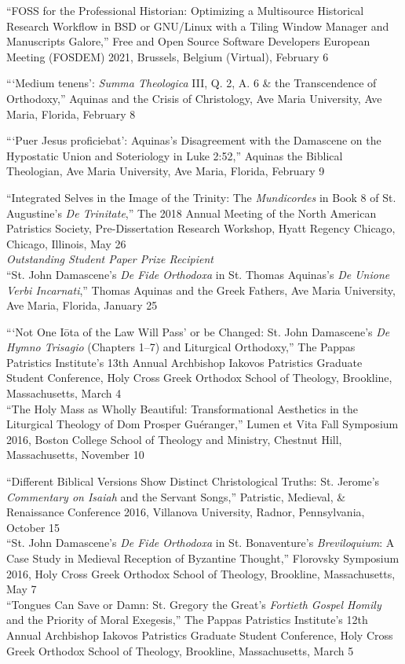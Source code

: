 \documentclass[letterpaper,12pt]{article}
\newcommand{\years}[1]{%
  {\reversemarginpar\strut\marginnote{{\small#1}}}%
}
\begin{document}
{{{{{{{%
``FOSS for the Professional Historian: Optimizing a Multisource Historical Research Workflow in BSD or GNU/Linux with a Tiling Window Manager and Manuscripts Galore,'' Free and Open Source Software Developers European Meeting (FOSDEM) 2021, Brussels, Belgium (Virtual), February 6 \\ [.3cm]
%
\years{2020}%
%
```Medium tenens': \emph{Summa Theologica} III, Q. 2, A. 6 \& the Transcendence of Orthodoxy,'' Aquinas and the Crisis of Christology, Ave Maria University, Ave Maria, Florida, February 8 \\ [.3cm]
%
\years{2019}%
%
```Puer Jesus proficiebat': Aquinas's Disagreement with the Damascene on the Hypostatic Union and Soteriology in Luke 2:52,'' Aquinas the Biblical Theologian, Ave Maria University, Ave Maria, Florida, February 9 \\ [.3cm]
%
\years{2018}%
%
``Integrated Selves in the Image of the Trinity: The \emph{Mundicordes} in Book 8 of St. Augustine's \emph{De Trinitate},'' The 2018 Annual Meeting of the North American Patristics Society, Pre-Dissertation Research Workshop, Hyatt Regency Chicago, Chicago, Illinois, May 26 \\
\hfill\emph{Outstanding Student Paper Prize Recipient} \\ [.3cm]
%
``St. John Damascene's \emph{De Fide Orthodoxa} in St. Thomas Aquinas's \emph{De Unione Verbi Incarnati},'' Thomas Aquinas and the Greek Fathers, Ave Maria University, Ave Maria, Florida, January 25 \\ [.3cm]
%
\years{2017}%
%
```Not One I\=ota of the Law Will Pass' or be Changed: St. John Damascene's \emph{De Hymno Trisagio} (Chapters 1–7) and Liturgical Orthodoxy,” The Pappas Patristics Institute's 13th Annual Archbishop Iakovos Patristics Graduate Student Conference, Holy Cross Greek Orthodox School of Theology, Brookline, Massachusetts, March 4 \\ [.3cm]
%
``The Holy Mass as Wholly Beautiful: Transformational Aesthetics in the Liturgical Theology of Dom Prosper Guéranger,'' Lumen et Vita Fall Symposium 2016, Boston College School of Theology and Ministry, Chestnut Hill, Massachusetts, November 10 \\ [.3cm]
%
\years{2016}%
%
``Different Biblical Versions Show Distinct Christological Truths: St. Jerome's \emph{Commentary on Isaiah} and the Servant Songs,'' Patristic, Medieval, \& Renaissance Conference 2016, Villanova University, Radnor, Pennsylvania, October 15 \\ [.3cm]
%
``St. John Damascene's \emph{De Fide Orthodoxa} in St. Bonaventure's \emph{Breviloquium}: A Case Study in Medieval Reception of Byzantine Thought,'' Florovsky Symposium 2016, Holy Cross Greek Orthodox School of Theology, Brookline, Massachusetts, May 7 \\ [.3cm]
%
``Tongues Can Save or Damn: St. Gregory the Great's \emph{Fortieth Gospel Homily} and the Priority of Moral Exegesis,'' The Pappas Patristics Institute's 12th Annual Archbishop Iakovos Patristics Graduate Student Conference, Holy Cross Greek Orthodox School of Theology, Brookline, Massachusetts, March 5

}}}}}}}
\end{document}

